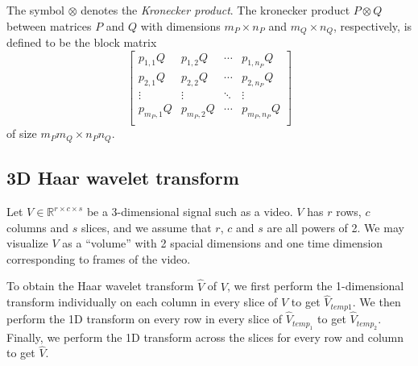 \documentclass[final,3p]{report}
\begin{document}
The symbol $\otimes$ denotes the \emph{Kronecker product}. 
The kronecker product $P \otimes Q$ between matrices $P$ and $Q$ with dimensions $m_P \times n_P$ and $m_Q \times n_Q$, respectively,  is defined to be the block matrix
\begin{equation*}
\begin{bmatrix}
p_{1,1} Q & p_{1,2} Q & \cdots & p_{1,n_P} Q \\
p_{2,1} Q & p_{2,2} Q & \cdots & p_{2,n_P} Q \\
\vdots&\vdots&\ddots&\vdots \\
p_{m_P,1} Q & p_{m_P,2} Q & \cdots & p_{m_P,n_P} Q \\
\end{bmatrix}
\end{equation*}
of size $m_Pm_Q \times n_Pn_Q$.

\subsection{3D Haar wavelet transform}
Let $V \in \mathbb{R}^{r\times c\times s}$ be a 3-dimensional signal such as a video. 
$V$ has $r$ rows, $c$ columns and $s$ slices, and we assume that $r$, $c$ and $s$ are all powers of 2. 
We may visualize $V$ as a ``volume'' with 2 spacial dimensions and one time dimension corresponding to frames of the video.

To obtain the Haar wavelet transform $\hat V$ of $V$, we first perform the 1-dimensional transform individually on each column in every slice of $V$ to get $\hat V_{temp1}$.
We then perform the 1D transform on every row in every slice of $\hat V_{temp_1}$ to get $\hat V_{temp_2}$.
Finally, we perform the 1D transform across the slices for every row and column to get $\hat V$.
\end{document}
